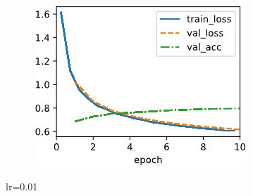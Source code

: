 \documentclass{article}
\begin{document}
\begin{figure}[ht]
\begin{center}
\begin{subfigure}[b]{0.3\columnwidth}
\includegraphics[width=\columnwidth]{img/lr0.01 cosine0.01.jpg}
\end{subfigure}
\caption{lr=0.01}
\label{lr:0.01}
\end{center}
\vskip -0.2in
\end{figure}
\end{document}

